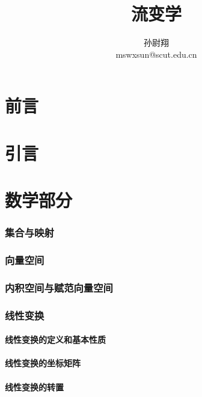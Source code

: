 \documentclass[zihao=-4,linespread=1.5,heading=true,a4paper,twoside]{ctexart}
\title{流变学}
\author{孙尉翔\\mswxsun@scut.edu.cn}
\theoremstyle{definition}
\theoremstyle{plain}
\begin{document}
\part*{前言}\label{sec:preface}


\newpage\tableofcontents

\newpage\part{引言}

\newpage\part{数学部分}
\section{集合与映射}\label{sec:II.1}




\section{向量空间}\label{sec:II.2}


\section{内积空间与赋范向量空间}\label{sec:II.3}


\section{线性变换}\label{sec:II.4}
\subsection{线性变换的定义和基本性质}\label{sec:II.4.1}


\subsection{线性变换的坐标矩阵}\label{sec:II.4.2}


\subsection{线性变换的转置}\label{sec:II.4.3}

\end{document}
